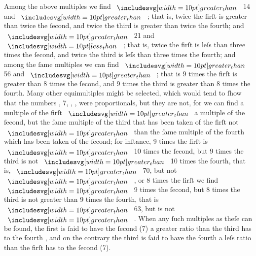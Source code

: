 \documentclass[12pt,preview]{standalone}
\begin{document}
\begin{minipage}{\textwidth}
    Among the above multiples we find {\color{cred}{16}} $\bgt$ 14 and {\color{cblue}{20}} $\bgt$ {\color{cyellow}{18}}; that is, twice the firſt is greater than twice the ſecond, and twice the third is greater than twice the fourth; and {\color{cred}{16}} $\bgt$ 21 and {\color{cblue}{20}} $\blt$ {\color{cyellow}{27}}; that is, twice the firſt is leſs than three times the ſecond, and twice the third is leſs than three times the fourth; and among the ſame multiples we can find {\color{cred}{72}} $\bgt$ 56 and {\color{cblue}{90}} $\bgt$ {\color{cyellow}{72}}; that is 9 times the firſt is greater than 8 times the ſecond, and 9 times the third is greater than 8 times the fourth. Many other equimultiples might be selected, which would tend to ſhow that the numbers {\color{cred}{8}}, 7, {\color{cblue}{10}}, {\color{cyellow}{9}}, were proportionals, but they are not, for we can find a multiple of the firſt $\bgt$ a multiple of the ſecond, but the ſame multiple of the third that has been taken of the firſt not $\bgt$ than the ſame multiple of the fourth which has been taken of the ſecond; for inſtance, 9 times the firſt is $\bgt$ 10 times the ſecond, but 9 times the third is not $\bgt$ 10 times the fourth, that is, {\color{cred}{72}} $\bgt$ 70, but {\color{cblue}{90}} not $\bgt$ {\color{cyellow}{90}}, or 8 times the firſt we find $\bgt$ 9 times the ſecond, but 8 times the third is not greater than 9 times the fourth, that is {\color{cred}{64}} $\bgt$ 63, but {\color{cblue}{80}} is not $\bgt$ {\color{cyellow}{81}}. When any ſuch multiples as theſe can be found, the first {\color{cred}{(8)}} is ſaid to have the ſecond (7) a greater ratio than the third {\color{cblue}{(10)}} has to the fourth {\color{cyellow}{(9)}}, and on the contrary the third {\color{cblue}{(10)}} is ſaid to have the fourth {\color{cyellow}{(9)}} a leſs ratio than the firſt {\color{cred}{(8)}} has to the ſecond (7).

\end{minipage}
\end{document}
